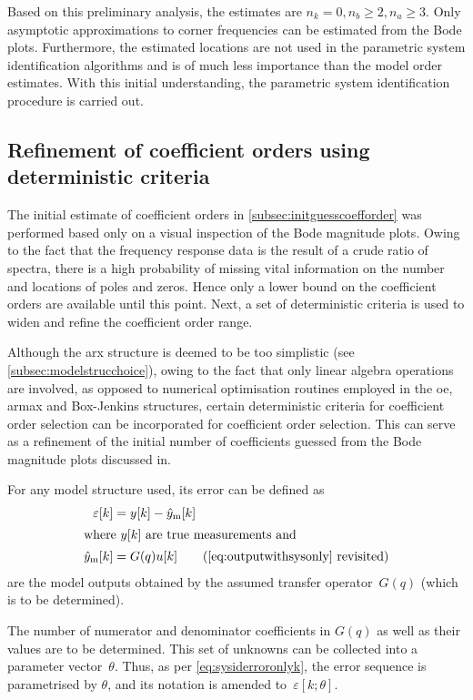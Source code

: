 Based on this preliminary  analysis, the estimates are $n_k = 0,  n_b \ge 2, n_a
\ge 3$.  Only asymptotic approximations  to corner frequencies can  be estimated
from the  Bode plots. Furthermore, the  estimated locations are not  used in the
parametric system identification algorithms and  is of much less importance than
the  model order  estimates.  With this  initial  understanding, the  parametric
system identification procedure is carried out.

\subsection{Refinement of coefficient orders using deterministic criteria}\label{subsec:refinementofcoefforder}

The initial estimate  of coefficient orders in \cref{subsec:initguesscoefforder}
was performed  based only on  a visual inspection  of the Bode  magnitude plots.
Owing to  the fact that  the frequency  response data is  the result of  a crude
ratio of  spectra, there is a  high probability of missing  vital information on
the number and locations of poles and zeros. Hence only a lower bound on the
coefficient orders are available until this point. Next, a set of deterministic
criteria is used to widen and refine the coefficient order range.


Although   the   \gls{arx}   structure   is  deemed   to   be   too   simplistic
(see \cref{subsec:modelstrucchoice}), owing to the fact that only linear algebra
operations are involved, as opposed  to numerical optimisation routines employed
in the  \gls{oe}, \gls{armax} and Box-Jenkins  structures, certain deterministic
criteria for  coefficient order  selection can  be incorporated  for coefficient
order selection.
This  can serve  as  a  refinement  of  the
initial number of  coefficients guessed from the Bode  magnitude plots discussed
in.

For any model structure used, its error can be defined as
\begin{align}
    \varepsilon[k]      & = y[k] - \hat{y}_\text{m}[k] \label{eq:sysiderroronlyk}\\
    \shortintertext{where $y[k]$ are true measurements and}
    \hat{y}_\text{m}[k] & = G(q)u[k] \tag{\cref{eq:outputwithsysonly} revisited}
\end{align}
are the model outputs obtained by the assumed transfer operator~$G(q)$ (which is
to be determined).

The  number of  numerator  and denominator  coefficients in  $G(q)$  as well  as
their  values are  to  be determined.  This  set of  unknowns  can be  collected
into a  parameter vector~$\theta$.  Thus, as per  \cref{eq:sysiderroronlyk}, the
error  sequence  is  parametrised  by  $\theta$, and  its  notation  is  amended
to~$\varepsilon[k;\theta]$.

